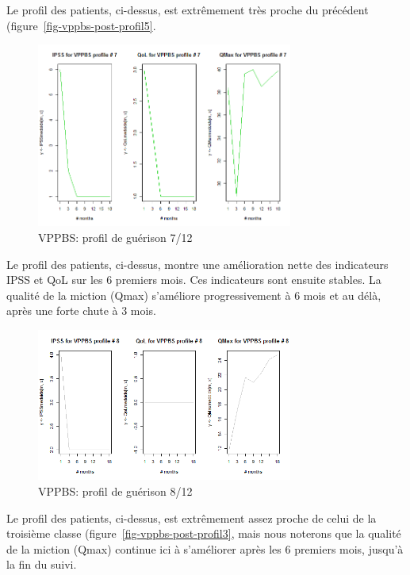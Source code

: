 Le profil des patients, ci-dessus, est extrêmement très proche du précédent (figure~\ref{fig-vppbs-post-profil5}.

\begin{figure}[H]
\centering
\includegraphics[width=0.75\textwidth]{../Fig/VPPBS/vppbs-profil-post-07.png}
\caption{VPPBS: profil de guérison 7/12}
\label{fig-vppbs-post-profil7}
\end{figure}

Le profil des patients, ci-dessus, montre une amélioration nette des indicateurs IPSS et QoL sur les 6 premiers mois. Ces indicateurs sont ensuite stables. La qualité de la miction (Qmax) s'améliore progressivement à 6 mois et au délà, après une forte chute à 3 mois.

\begin{figure}[H]
\centering
\includegraphics[width=0.75\textwidth]{../Fig/VPPBS/vppbs-profil-post-08.png}
\caption{VPPBS: profil de guérison 8/12}
\label{fig-vppbs-post-profil8}
\end{figure}

Le profil des patients, ci-dessus, est extrêmement assez proche de celui de la troisième classe (figure~\ref{fig-vppbs-post-profil3}, mais nous noterons que la qualité de la miction (Qmax) continue ici à s'améliorer après les 6 premiers mois, jusqu'à la fin du suivi.

